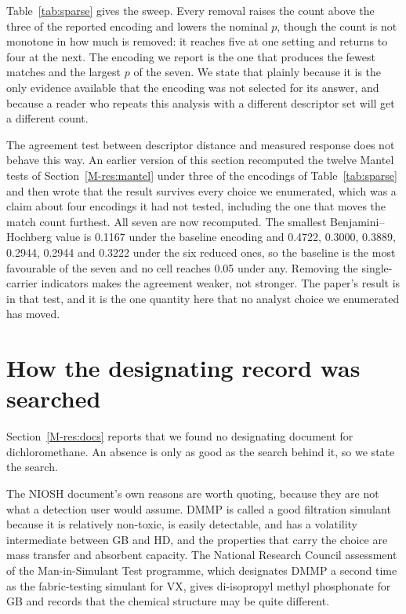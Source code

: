 \documentclass[journal=jacsat,manuscript=suppinfo,margin=1in]{achemso}
\begin{document}
Table~\ref{tab:sparse} gives the sweep. Every removal raises the count above
the three of the reported encoding and lowers the nominal $p$, though the count
is not monotone in how much is removed: it reaches five at one setting and
returns to four at the next. The
encoding we report is the one that produces the fewest matches and the largest
$p$ of the seven. We state that plainly because it is the only evidence
available that the encoding was not selected for its answer, and because a
reader who repeats this analysis with a different descriptor set will get a
different count.

The agreement test between descriptor distance and measured response does not
behave this way. An earlier version of this section recomputed the twelve
Mantel tests of Section~\ref{M-res:mantel} under three of the encodings of
Table~\ref{tab:sparse} and then wrote that the result survives every choice we
enumerated, which was a claim about four encodings it had not tested, including
the one that moves the match count furthest. All seven are now recomputed. The
smallest Benjamini--Hochberg value is 0.1167 under the baseline encoding and
0.4722, 0.3000, 0.3889, 0.2944, 0.2944 and 0.3222 under the six reduced ones,
so the baseline is the most favourable of the seven and no cell reaches 0.05
under any. Removing the single-carrier indicators makes the agreement weaker,
not stronger. The paper's result is in that test, and it is the one quantity
here that no analyst choice we enumerated has moved.

\section{How the designating record was searched}
\label{meth:docsearch}

Section~\ref{M-res:docs} reports that we found no designating document for
dichloromethane. An absence is only as good as the search behind it, so we
state the search.

The NIOSH document's own reasons are worth quoting, because they are not what
a detection user would assume. DMMP is called a good filtration simulant
because it is relatively non-toxic, is easily detectable, and has a volatility
intermediate between GB and HD, and the properties that carry the choice are
mass transfer and absorbent capacity. The National Research Council assessment
of the Man-in-Simulant Test programme, which designates DMMP a second time as
the fabric-testing simulant for VX, gives di-isopropyl methyl phosphonate for
GB and records that the chemical structure may be quite
different.\cite{nrc1997mist}
\end{document}
